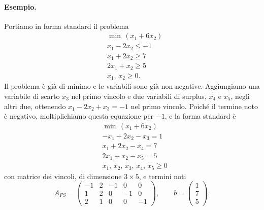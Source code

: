 \paragraph{Esempio.}
Portiamo in forma standard il problema
\[
\begin{aligned}
&\min\, (x_1 + 6x_2) \\
&x_1 - 2x_2 \le -1 \\
&x_1 + 2x_2 \ge 7 \\
&2x_1 + x_2 \ge 5 \\
&x_1,\, x_2 \ge 0.
\end{aligned}
\]
Il problema è già di minimo e le variabili sono già non negative. Aggiungiamo una variabile di scarto $x_3$ nel primo vincolo e due variabili di surplus, $x_4$ e $x_5$, negli altri due, ottenendo $x_1 - 2x_2 + x_3 = -1$ nel primo vincolo. Poiché il termine noto è negativo, moltiplichiamo questa equazione per $-1$, e la forma standard è
\[
\begin{aligned}
&\min\, (x_1 + 6x_2) \\
&-x_1 + 2x_2 - x_3 = 1 \\
&x_1 + 2x_2 - x_4 = 7 \\
&2x_1 + x_2 - x_5 = 5 \\
&x_1,\, x_2,\, x_3,\, x_4,\, x_5 \ge 0
\end{aligned}
\]
con matrice dei vincoli, di dimensione $3 \times 5$, e termini noti
\[
A_{FS} = \begin{pmatrix} -1 & 2 & -1 & 0 & 0 \\ 1 & 2 & 0 & -1 & 0 \\ 2 & 1 & 0 & 0 & -1 \end{pmatrix}, \qquad
b = \begin{pmatrix} 1 \\ 7 \\ 5 \end{pmatrix}.
\]


